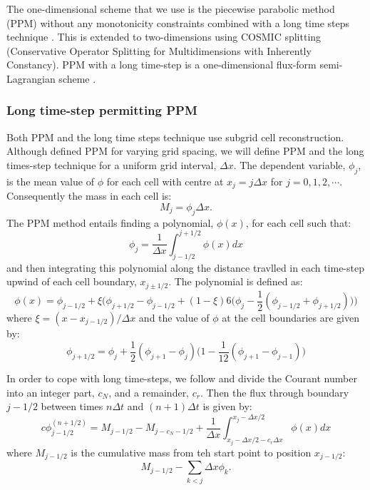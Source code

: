 The one-dimensional scheme that we use is the piecewise parabolic method (PPM) \citep{Colella1984} without any monotonicity constraints combined with a long time steps technique \citep{Leonard1995}. This is extended to two-dimensions using COSMIC splitting \citep{Leonard1996} (Conservative Operator Splitting for Multidimensions with Inherently Constancy). PPM with a long time-step is a one-dimensional flux-form semi-Lagrangian scheme \citep{Lin1996}.

\subsubsection{Long time-step permitting PPM} 
\label{sec:PPM}

Both PPM and the long time steps technique use subgrid cell reconstruction. Although
\cite{Colella1984} defined PPM for varying grid spacing, we will define PPM and the long times-step technique for a uniform grid interval, $\Delta x$. The dependent variable, $\phi_j$, is the mean value of $\phi$ for each cell with centre at $x_j = j\Delta x$ for $j = 0, 1, 2, \cdots$. Consequently the mass in each cell is:
\[
M_j = \phi_j \Delta x.
\]
The PPM method entails finding a polynomial, $\phi(x)$, for each cell such that:
\[
\phi_j = \frac{1}{\Delta x} \int_{j-1/2}^{j+1/2} \phi(x) dx
\]
and then integrating this polynomial along the distance travlled in each time-step upwind of each cell boundary, $x_{j\pm 1/2}$. The polynomial is defined as:
\[
\phi(x) = \phi_{j-1/2}
        + \xi \biggl(\phi_{j+1/2} - \phi_{j-1/2}
                + (1-\xi)6\bigl(\phi_j - \frac{1}{2}(\phi_{j-1/2} + \phi_{j+1/2})\bigr)
              \biggr)
\]
where $\xi=(x-x_{j-1/2})/\Delta x$ and the value of $\phi$ at the cell boundaries are given by:
\[
\phi_{j+1/2} = \phi_j + \frac{1}{2}(\phi_{j+1} - \phi_j)
\biggl(
     1-\frac{1}{12}(\phi_{j+1} - \phi_{j-1})
\biggr)
\]

In order to cope with long time-steps, we follow \cite{Leonard1995} and divide the Courant number into an integer part, $c_N$, and a remainder, $c_r$. Then the flux through boundary $j-1/2$ between times $n\Delta t$ and $(n+1)\Delta t$ is given by:
\[
c \phi_{j-1/2}^{(n+1/2)} = M_{j-1/2} - M_{j-c_N-1/2} + \frac{1}{\Delta x}
\int_{x_j-\Delta x/2 - c_r \Delta x}^{x_j - \Delta x/2}
\phi(x) dx
\]
where $M_{j-1/2}$ is the cumulative mass from teh start point to position $x_{j-1/2}$:
\[
M_{j-1/2} - \sum_{k<j} \Delta x \phi_k.
\]

